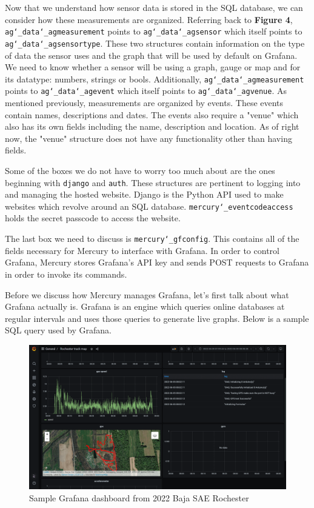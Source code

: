 \documentclass[12pt, letterpaper]{article}
\begin{document}
\par Now that we understand how sensor data is stored in the SQL database, we can consider how these measurements are organized. Referring back to \textbf{Figure 4}, \texttt{ag\char`_data\char`_agmeasurement} points to \texttt{ag\char`_data\char`_agsensor} which itself points to \\ \texttt{ag\char`_data\char`_agsensortype}. These two structures contain information on the type of data the sensor uses and the graph that will be used by default on Grafana. We need to know whether a sensor will be using a graph, gauge or map and for its datatype: numbers, strings or bools. Additionally, \texttt{ag\char`_data\char`_agmeasurement} points to \texttt{ag\char`_data\char`_agevent} which itself points to \texttt{ag\char`_data\char`_agvenue}. As mentioned previously, measurements are organized by events. These events contain names, descriptions and dates. The events also require a "venue" which also has its own fields including the name, description and location. As of right now, the "venue" structure does not have any functionality other than having fields.

\par Some of the boxes we do not have to worry too much about are the ones beginning with \texttt{django} and \texttt{auth}. These structures are pertinent to logging into and managing the hosted website. Django is the Python API used to make websites which revolve around an SQL database. \texttt{mercury\char`_eventcodeaccess} holds the secret passcode to access the website. 
	
	\par The last box we need to discuss is \texttt{mercury\char`_gfconfig}. This contains all of the fields necessary for Mercury to interface with Grafana. In order to control Grafana, Mercury stores Grafana's API key and sends POST requests to Grafana in order to invoke its commands. 
	\par Before we discuss how Mercury manages Grafana, let's first talk about what Grafana actually is. Grafana is an engine which queries online databases at regular intervals and uses those queries to generate live graphs. Below is a sample SQL query used by Grafana.

\begin{figure}[t!]
\centering
\includegraphics[width=1\columnwidth]{assets/grafana-example.png}
\caption{Sample Grafana dashboard from 2022 Baja SAE Rochester}
\end{figure}	
	
\end{document}
